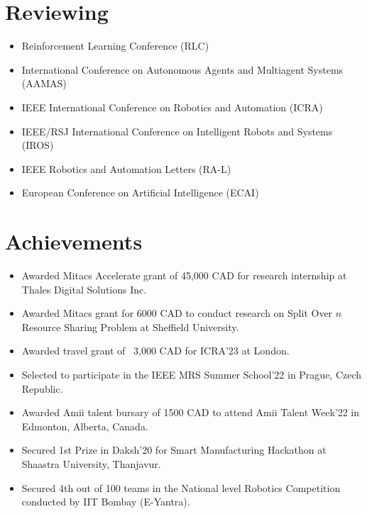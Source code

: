 \documentclass[letterpaper,10pt]{article}
\newenvironment{cvitemize}{
    \begin{itemize}[leftmargin=10pt,label={},afterlabel={},after=\vspace{-12pt}]
}{
    \end{itemize}
}
\begin{document}
\section*{Reviewing}
\begin{cvitemize}
    \item Reinforcement Learning Conference (RLC)
    \item International Conference on Autonomous Agents and Multiagent Systems (AAMAS)
    \item IEEE International Conference on Robotics and Automation (ICRA)
    \item IEEE/RSJ International Conference on Intelligent Robots and Systems (IROS)
    \item IEEE Robotics and Automation Letters (RA-L)
    \item European Conference on Artificial Intelligence (ECAI)
\end{cvitemize}

\section*{Achievements}
\begin{itemize}
    \item Awarded Mitacs Accelerate grant of 45,000 CAD for research internship at Thales Digital Solutions Inc.
    \item Awarded Mitacs grant for 6000 CAD to conduct research on Split Over $n$ Resource Sharing Problem at Sheffield University.
    \item Awarded travel grant of ~3,000 CAD for ICRA’23 at London.
    \item Selected to participate in the IEEE MRS Summer School’22 in Prague, Czech Republic.
    \item Awarded Amii talent bursary of 1500 CAD to attend Amii Talent Week’22 in Edmonton, Alberta, Canada.
    \item Secured 1st Prize in Daksh’20 for Smart Manufacturing Hackathon at Shaastra University, Thanjavur.
    \item Secured 4th out of 100 teams in the National level Robotics Competition conducted by IIT Bombay (E-Yantra).
\end{itemize}
\end{document}
